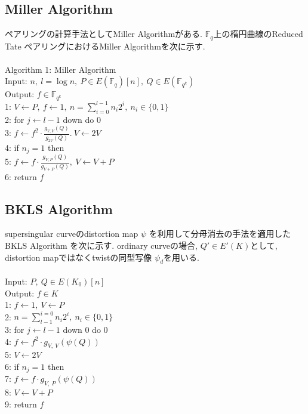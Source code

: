 \documentclass[twocolumn]{jsarticle} %
\begin{document}
\subsection{Miller Algorithm}
ペアリングの計算手法としてMiller Algorithmがある. $\mathbb{F}_q$上の楕円曲線のReduced Tate ペアリングにおけるMiller Algorithmを次に示す. \\\\
\noindent Algorithm 1: Miller Algorithm\\
Input: $n, \ l=\log n, \ P \in E(\mathbb{F}_q)[n], \ Q \in E(\mathbb{F}_{q^k})$ \\
Output: $f \in \mathbb{F}_{q^k}$  \\
1: \quad $V \gets P, \ f \gets 1,\ n=\sum^{l-1}_{i=0} n_i 2^i, \ n_i \in \{0,1\}$\\
2: \quad for $j \gets l-1$ down do 0\\
3: \quad \quad $f \gets f^2 \cdot \frac{g_{V,V}(Q)}{g_{2V}(Q)}.\ V \gets 2V$\\
4: \quad if $n_j = 1$ then\\
5: \quad \quad $f \gets f \cdot \frac{g_{V,P}(Q)}{g_{V+P}(Q)},\ V \gets V+P$\\
6: \quad return $f$\\

\subsection{BKLS Algorithm}
 supersingular curveのdistortion map $\psi$ を利用して分母消去の手法を適用したBKLS Algorithm \cite{BKLS02}を次に示す. ordinary curveの場合, $Q' \in E'(K)$として, distortion mapではなくtwistの同型写像 $\psi _d$を用いる. \\\\
 Input: $P,\ Q \in E(K_0)[n]$\\
 Output: $f \in K$\\
 1: \quad $f \gets 1,\ V \gets P$\\
 2: \quad $n=\sum_{l-1}^{i=0} n_i 2^i, \ n_i \in \{0,1\}$\\
 3: \quad for $j \gets l-1$ down 0 do 0\\
 4: \quad \quad $f \gets f^2 \cdot g_{V,\ V}(\psi (Q))$\\
 5: \quad \quad $V \gets 2V$\\
 6: \quad if $n_j = 1$ then\\
 7: \quad \quad $f \gets f \cdot g_{V,\ P}(\psi (Q))$\\
 8: \quad \quad $V \gets V+P$\\
 9: \quad return $f$\\
\par
\end{document}
